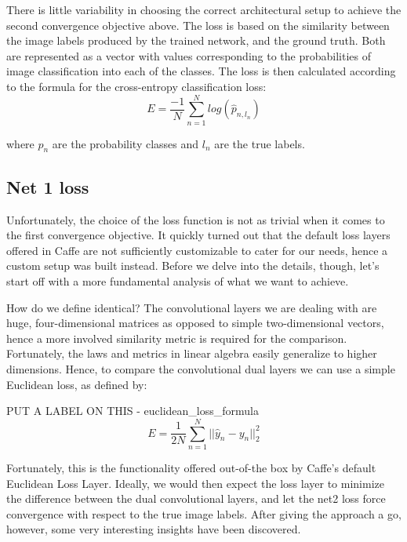 \documentclass[a4paper, 12pt]{article}
\numberwithin{equation}{section}
\begin{document}
	There is little variability in choosing the correct architectural setup to achieve the second convergence objective above. The loss is based on the similarity between the image labels produced by the trained network, and the ground truth. Both are represented as a vector with values corresponding to the probabilities of image classification into each of the classes. The loss is then calculated according to the formula for the cross-entropy classification loss:
	\begin{equation}
		E = \frac{-1}{N} \sum_{n=1}^{N} log(\hat{p}_{n,l_n})
	\end{equation}
	
	where $\hat{p}_n$ are the probability classes and $l_n$ are the true labels.
	
	\subsection{Net 1 loss}
	
	Unfortunately, the choice of the loss function is not as trivial when it comes to the first convergence objective. It quickly turned out that the default loss layers offered in Caffe are not sufficiently customizable to cater for our needs, hence a custom setup was built instead. Before we delve into the details, though, let's start off with a more fundamental analysis of what we want to achieve.
	
	How do we define identical? The convolutional layers we are dealing with are huge, four-dimensional matrices as opposed to simple two-dimensional vectors, hence a more involved similarity metric is required for the comparison. Fortunately, the laws and metrics in linear algebra easily generalize to higher dimensions. Hence, to compare the convolutional dual layers we can use a simple Euclidean loss, as defined by:
	
	PUT A LABEL ON THIS - euclidean\_loss\_formula
	\begin{equation}
		E=\frac{1}{2N} \sum_{n=1}^{N} ||\hat{y}_n-y_n||^2_2
	\end{equation}
	
	Fortunately, this is the functionality offered out-of-the box by Caffe's default Euclidean Loss Layer. Ideally, we would then expect the loss layer to minimize the difference between the dual convolutional layers, and let the net2 loss force convergence with respect to the true image labels. After giving the approach a go, however, some very interesting insights have been discovered.
		
\end{document}
